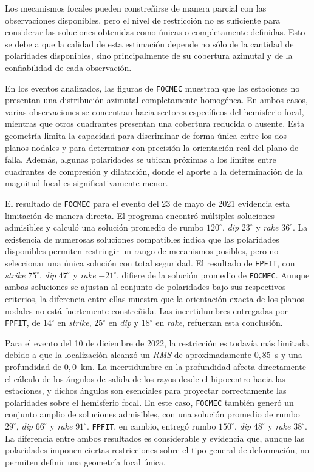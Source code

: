\documentclass[a4paper,12pt]{article} %
\numberwithin{equation}{section} %
\numberwithin{figure}{section} %
\begin{document}
Los mecanismos focales pueden constreñirse de manera parcial con las observaciones disponibles, pero el nivel de restricción no es suficiente para considerar las soluciones obtenidas como únicas o completamente definidas. Esto se debe a que la calidad de esta estimación depende no sólo de la cantidad de polaridades disponibles, sino principalmente de su cobertura azimutal y de la confiabilidad de cada observación.

En los eventos analizados, las figuras de \texttt{FOCMEC} muestran que las estaciones no presentan una distribución azimutal completamente homogénea. En ambos casos, varias observaciones se concentran hacia sectores específicos del hemisferio focal, mientras que otros cuadrantes presentan una cobertura reducida o ausente. Esta geometría limita la capacidad para discriminar de forma única entre los dos planos nodales y para determinar con precisión la orientación real del plano de falla. Además, algunas polaridades se ubican próximas a los límites entre cuadrantes de compresión y dilatación, donde el aporte a la determinación de la magnitud focal es significativamente menor.

El resultado de \texttt{FOCMEC} para el evento del 23 de mayo de 2021 evidencia esta limitación de manera directa. El programa encontró múltiples soluciones admisibles y calculó una solución promedio de rumbo $120^\circ$, \textit{dip} $23^\circ$ y \textit{rake} $36^\circ$. La existencia de numerosas soluciones compatibles indica que las polaridades disponibles permiten restringir un rango de mecanismos posibles, pero no seleccionar una única solución con total seguridad. El resultado de \texttt{FPFIT}, con \textit{strike} $75^\circ$, \textit{dip} $47^\circ$ y \textit{rake} $-21^\circ$, difiere de la solución promedio de \texttt{FOCMEC}. Aunque ambas soluciones se ajustan al conjunto de polaridades bajo sus respectivos criterios, la diferencia entre ellas muestra que la orientación exacta de los planos nodales no está fuertemente constreñida. Las incertidumbres entregadas por \texttt{FPFIT}, de $14^\circ$ en \textit{strike}, $25^\circ$ en \textit{dip} y $18^\circ$ en \textit{rake}, refuerzan esta conclusión.

Para el evento del 10 de diciembre de 2022, la restricción es todavía más limitada debido a que la localización alcanzó un \textit{RMS} de aproximadamente $0{,}85$~s y una profundidad de $0{,}0$~km. La incertidumbre en la profundidad afecta directamente el cálculo de los ángulos de salida de los rayos desde el hipocentro hacia las estaciones, y dichos ángulos son esenciales para proyectar correctamente las polaridades sobre el hemisferio focal. En este caso, \texttt{FOCMEC} también generó un conjunto amplio de soluciones admisibles, con una solución promedio de rumbo $29^\circ$, \textit{dip} $66^\circ$ y \textit{rake} $91^\circ$. \texttt{FPFIT}, en cambio, entregó rumbo $150^\circ$, \textit{dip} $48^\circ$ y \textit{rake} $38^\circ$. La diferencia entre ambos resultados es considerable y evidencia que, aunque las polaridades imponen ciertas restricciones sobre el tipo general de deformación, no permiten definir una geometría focal única.
\end{document}
